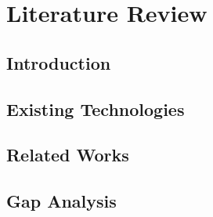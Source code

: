 \section{Literature Review}
\label{sec:review}
%

\subsection{Introduction}
\subsection{Existing Technologies}
\subsection{Related Works}
\subsection{Gap Analysis}
